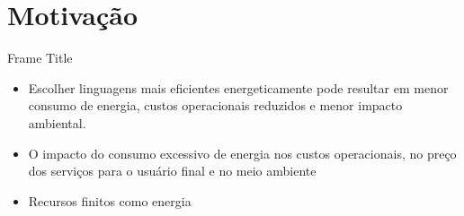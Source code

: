 \section{Motivação}

\begin{frame}{Frame Title}
    \begin{itemize}
        \item Escolher linguagens mais eficientes energeticamente pode resultar em menor consumo de energia, custos operacionais reduzidos e menor impacto ambiental.
        \item O impacto do consumo excessivo de energia nos custos operacionais, no preço dos serviços para o usuário final e no meio ambiente
        \item Recursos finitos como energia
    \end{itemize}
\end{frame}
